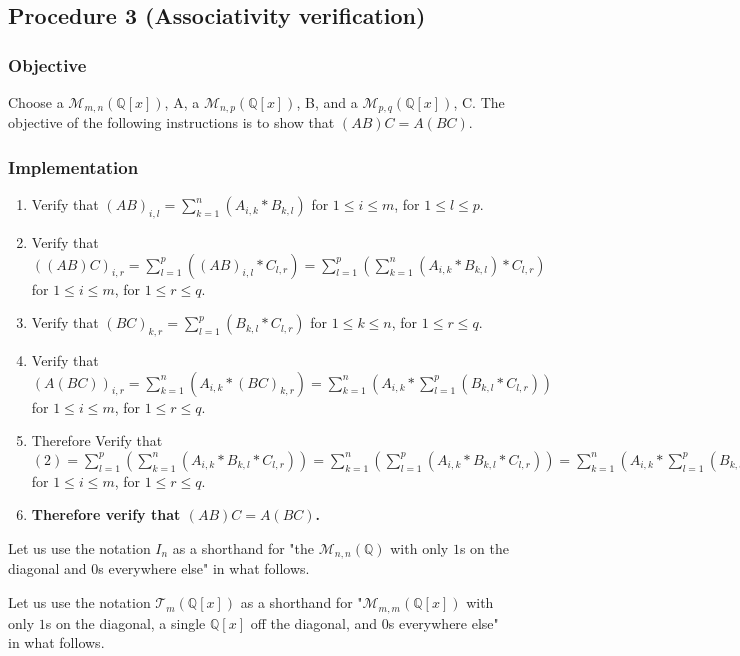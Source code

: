\documentclass[twocolumn]{article}
\begin{document}
		\subsection{Procedure 3 (Associativity verification)}\label{sec:procedure 3}
			\subsubsection{Objective}
				Choose a $\mathcal{M}_{m,n}(\mathbb{Q}[x])$, A, a $\mathcal{M}_{n,p}(\mathbb{Q}[x])$, B, and a $\mathcal{M}_{p,q}(\mathbb{Q}[x])$, C. The objective of the following instructions is to show that $(AB)C=A(BC)$.
			\subsubsection{Implementation}
				\begin{enumerate}
					\item Verify that $(AB)_{i,l}=\sum_{k=1}^{n} \left(A_{i,k}*B_{k,l}\right)$ for $1\le i\le m$, for $1\le l\le p$.
					\item Verify that $((AB)C)_{i,r}=\sum_{l=1}^{p} \left((AB)_{i,l}*C_{l,r}\right)=\sum_{l=1}^{p} \left(\sum_{k=1}^{n} \left(A_{i,k}*B_{k,l}\right)*C_{l,r}\right)$ for $1\le i\le m$, for $1\le r\le q$.
					\item Verify that $(BC)_{k,r}=\sum_{l=1}^{p}\left(B_{k,l}*C_{l,r}\right)$ for $1\le k\le n$, for $1\le r\le q$.
					\item Verify that $(A(BC))_{i,r}=\sum_{k=1}^{n}\left(A_{i,k}*(BC)_{k,r}\right)=\sum_{k=1}^{n}\left(A_{i,k}*\sum_{l=1}^{p}\left(B_{k,l}*C_{l,r}\right)\right)$ for $1\le i\le m$, for $1\le r\le q$.
					\item Therefore Verify that $(2)=\sum_{l=1}^{p} \left(\sum_{k=1}^{n} \left(A_{i,k}*B_{k,l}*C_{l,r}\right)\right)=\sum_{k=1}^{n} \left(\sum_{l=1}^{p} \left(A_{i,k}*B_{k,l}*C_{l,r}\right)\right)=\sum_{k=1}^{n}\left(A_{i,k}*\sum_{l=1}^{p}\left(B_{k,l}*C_{l,r}\right)\right)=(4)$ for $1\le i\le m$, for $1\le r\le q$.
					\item \textbf{Therefore verify that $(AB)C=A(BC)$.}
				\end{enumerate}
		Let us use the notation $I_n$ as a shorthand for "the $\mathcal{M}_{n,n}(\mathbb{Q})$ with only $1$s on the diagonal and $0$s everywhere else" in what follows.
		
		Let us use the notation $\mathcal{T}_{m}(\mathbb{Q}[x])$ as a shorthand for "$\mathcal{M}_{m,m}(\mathbb{Q}[x])$ with only $1$s on the diagonal, a single $\mathbb{Q}[x]$ off the diagonal, and $0$s everywhere else" in what follows.
\end{document}
